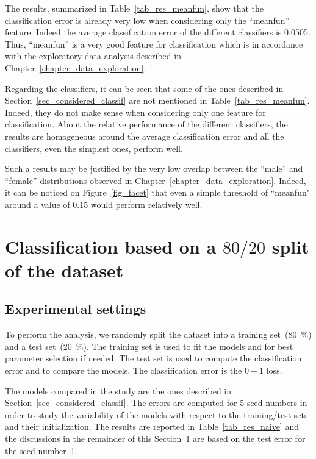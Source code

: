 The results, summarized in Table~\ref{tab_res_meanfun}, show that the classification error is already very low when considering only the ``meanfun'' feature. Indeed the average classification error of the different classifiers is \num{0.0505}. Thus, ``meanfun'' is a very good feature for classification which is in accordance with the exploratory data analysis described in Chapter~\ref{chapter_data_exploration}. 

Regarding the classifiers, it can be seen that some of the ones described in Section~\ref{sec_considered_classif} are not mentioned in Table~\ref{tab_res_meanfun}. Indeed, they do not make sense when considering only one feature for classification. 
About the relative performance of the different classifiers, the results are homogeneous around the average classification error and all the classifiers, even the simplest ones, perform well.

Such a results may be justified by the very low overlap between the ``male'' and ``female'' distributions observed in Chapter~\ref{chapter_data_exploration}. Indeed, it can be noticed on Figure~\ref{fig_facet} that even a simple threshold of ``meanfun" around a value of \num{0.15} would perform relatively well. 

\section{Classification based on a $80/20$ split of the dataset}
\label{sec_naive_strat}

\subsection{Experimental settings}
To perform the analysis, we randomly split the dataset into a training set~(\SI{80}{\percent}) and a test set~(\SI{20}{\percent}). 
The training set is used to fit the models and for best parameter selection if needed. 
The test set is used to compute the classification error and to compare the models. The classification error is the $0-1$ loss. 

The models compared in the study are the ones described in Section~\ref{sec_considered_classif}. 
The errors are computed for \num{5} seed numbers in order to study the variability of the models with respect to the training/test sets and their initialization. 
The results are reported in Table~\ref{tab_res_naive} and the discussions in the remainder of this Section~\ref{sec_naive_strat} are based on the test error for the seed number~\num{1}.

